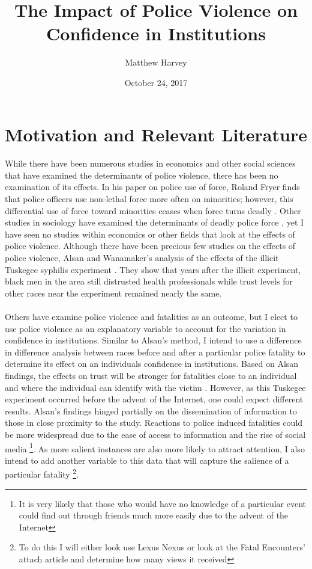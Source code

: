 \documentclass{article}
\title{The Impact of Police Violence on Confidence in Institutions}
\date{October 24, 2017}
\author{Matthew Harvey}
\begin{document}
  \maketitle
  
\section{ Motivation and Relevant Literature}

\paragraph{}While there have been numerous studies in economics and other social sciences that have examined the determinants of police violence, there has been no examination of its effects. In his paper on police use of force, Roland Fryer finds that police officers use non-lethal force more often on minorities; however, this differential use of force toward minorities ceases when force turns deadly \cite{fryer2016empirical}. Other studies in sociology have examined the determinants of deadly police force \cite{jacobs1998determinants} \cite{jacobs1979inequality}, yet I have seen no studies within economics or other fields that look at the effects of police violence. Although there have been precious few studies on the effects of police violence, Alsan and Wanamaker's analysis of the effects of the illicit Tuskegee syphilis experiment \cite{alsan2016tuskegee}. They show that years after the illicit experiment, black men in the area still distrusted health professionals while trust levels for other races near the experiment remained nearly the same. 
\paragraph{} Others have examine police violence and fatalities as an outcome, but I elect to use police violence as an explanatory variable to account for the variation in confidence in institutions. Similar to Alsan's method, I intend to use a difference in difference analysis between races before and after a particular police fatality to determine its effect on an individuals confidence in institutions. Based on Alsan findings, the effects on trust will be stronger for fatalities close to an individual and where the individual can identify with the victim \cite{alsan2016tuskegee}. However, as this Tuskegee experiment occurred before the advent of the Internet, one could expect different results. Alsan's findings hinged partially on the dissemination of information to those in close proximity to the study. Reactions to police induced fatalities could be more widespread due to the ease of access to information and the rise of social media \footnote{It is very likely that those who would have no knowledge of a particular event could find out through friends much more easily due to the advent of the Internet}.  As more salient instances are also more likely to attract attention, I also intend to add another variable to this data that will capture the salience of a particular fatality \footnote{To do this I will either look use Lexus Nexus or look at the Fatal Encounters' attach article and determine how many views it received}.
\end{document}
